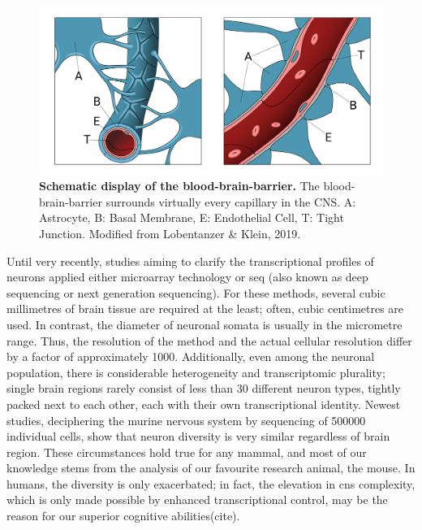 \begin{figure}
\includegraphics[width=\textwidth]{figures/bbb}
\caption[The blood-brain-barrier.]{\textbf{Schematic display of the blood-brain-barrier.} The blood-brain-barrier surrounds virtually every capillary in the CNS. A: Astrocyte, B: Basal Membrane, E: Endothelial Cell, T: Tight Junction. Modified from Lobentanzer \& Klein, 2019\cite{Lobentanzer2019b}.
\label{fig:bbb}}
\end{figure}

Until very recently, studies aiming to clarify the transcriptional profiles of neurons applied either microarray technology or \ac{seq} (also known as deep sequencing or next generation sequencing). For these methods, several cubic millimetres of brain tissue are required at the least; often, cubic centimetres are used. In contrast, the diameter of neuronal somata is usually in the micrometre range. Thus, the resolution of the method and the actual cellular resolution differ by a factor of approximately \num{1000}. Additionally, even among the neuronal population, there is considerable heterogeneity and transcriptomic plurality; single brain regions rarely consist of less than 30 different neuron types, tightly packed next to each other, each with their own transcriptional identity\cite{Darmanis2015, Zeisel2015, Tasic2016, Habib2016}. Newest studies, deciphering the murine nervous system by sequencing of \num{500000} individual cells, show that neuron diversity is very similar regardless of brain region\cite{Zeisel2018}. These circumstances hold true for any mammal, and most of our knowledge stems from the analysis of our favourite research animal, the mouse. In humans, the diversity is only exacerbated; in fact, the elevation in \ac{cns} complexity, which is only made possible by enhanced transcriptional control, may be the reason for our superior cognitive abilities(cite).

